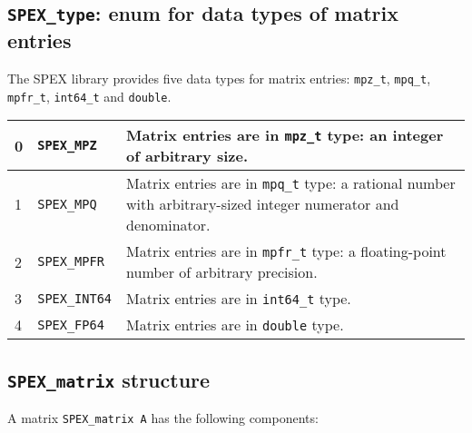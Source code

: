 \documentclass[12pt]{report}
\theoremstyle{definition}
\begin{document}
\cprotect\subsection{\verb|SPEX_type|: enum for data types of matrix entries}
\label{ss:SPEX_type}

The SPEX library provides five data types for matrix entries: \verb|mpz_t|,
\verb|mpq_t|, \verb|mpfr_t|, \verb|int64_t| and \verb|double|.

{\small
\begin{center}
\begin{tabular}{llp{4in}}
\hline
0 & \verb|SPEX_MPZ|     & Matrix entries are in \verb|mpz_t| type: an integer
                          of arbitrary size. \\
\hline
1 & \verb|SPEX_MPQ|     & Matrix entries are in \verb|mpq_t| type: a rational
                          number with arbitrary-sized integer numerator and
                          denominator. \\
\hline
2 & \verb|SPEX_MPFR|    & Matrix entries are in \verb|mpfr_t| type: a
                          floating-point number of arbitrary precision. \\
\hline
3 & \verb|SPEX_INT64|   & Matrix entries are in \verb|int64_t| type. \\
\hline
4 & \verb|SPEX_FP64|    & Matrix entries are in \verb|double| type. \\
\hline
\end{tabular}
\label{tab:SPEX_type}
\end{center}
}

\cprotect\subsection{\verb|SPEX_matrix| structure}

A matrix \verb|SPEX_matrix A| has the following components:
\end{document}
